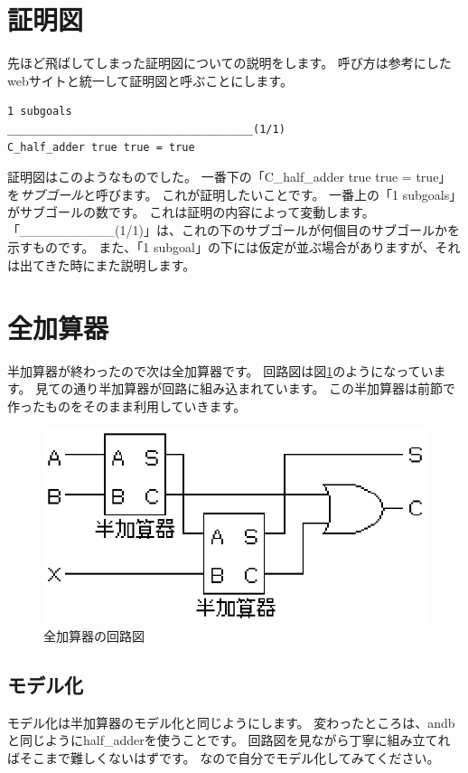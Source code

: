 \documentclass{jsbook}
\begin{document}
\section{証明図}
先ほど飛ばしてしまった証明図についての説明をします。
呼び方は参考にしたwebサイトと統一して証明図と呼ぶことにします。
\begin{verbatim}
1 subgoals
______________________________________(1/1)
C_half_adder true true = true
\end{verbatim}
証明図はこのようなものでした。
一番下の「C\_half\_adder true true = true」を\emph{サブゴール}と呼びます。
これが証明したいことです。
一番上の「1 subgoals」がサブゴールの数です。
これは証明の内容によって変動します。
「\_\_\_\_\_\_\_\_\_\_(1/1)」は、これの下のサブゴールが何個目のサブゴールかを示すものです。
また、「1 subgoal」の下には仮定が並ぶ場合がありますが、それは出てきた時にまた説明します。

\section{全加算器}
半加算器が終わったので次は全加算器です。
回路図は図\ref{full_adder}のようになっています。
見ての通り半加算器が回路に組み込まれています。
この半加算器は前節で作ったものをそのまま利用していきます。
\begin{figure}[htbp]
\begin{center}
  \includegraphics[scale=1.0]{image/full_adder.eps}
  \caption{全加算器の回路図 \protect \footnotemark}
  \label{full_adder}
\end{center}
\end{figure}
\subsection*{モデル化}
モデル化は半加算器のモデル化と同じようにします。
変わったところは、andbと同じようにhalf\_adderを使うことです。
回路図を見ながら丁寧に組み立てればそこまで難しくないはずです。
なので自分でモデル化してみてください。
\end{document}
